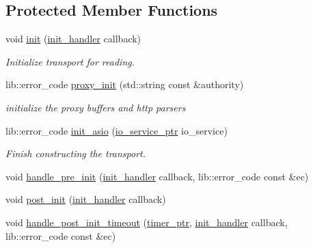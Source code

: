 \subsection*{Protected Member Functions}
\begin{DoxyCompactItemize}
\item 
void \hyperlink{classwebsocketpp_1_1transport_1_1asio_1_1connection_ae09d85b808498f06bcc8d938c9107e8e}{init} (\hyperlink{namespacewebsocketpp_1_1transport_aeae75e675c1a334b3b33ab7120b480a5}{init\+\_\+handler} callback)
\begin{DoxyCompactList}\small\item\em Initialize transport for reading. \end{DoxyCompactList}\item 
lib\+::error\+\_\+code \hyperlink{classwebsocketpp_1_1transport_1_1asio_1_1connection_a2397c24d0ab9b344d70328788de721d4}{proxy\+\_\+init} (std\+::string const \&authority)
\begin{DoxyCompactList}\small\item\em initialize the proxy buffers and http parsers \end{DoxyCompactList}\item 
lib\+::error\+\_\+code \hyperlink{classwebsocketpp_1_1transport_1_1asio_1_1connection_a6432e2cbcb4e7781a6910dd7c9aa05e6}{init\+\_\+asio} (\hyperlink{classwebsocketpp_1_1transport_1_1asio_1_1connection_a8a0bff59326cab2996e414d32f627232}{io\+\_\+service\+\_\+ptr} io\+\_\+service)
\begin{DoxyCompactList}\small\item\em Finish constructing the transport. \end{DoxyCompactList}\item 
void \hyperlink{classwebsocketpp_1_1transport_1_1asio_1_1connection_a27730f6446dd626f40b17ad1b26e5b77}{handle\+\_\+pre\+\_\+init} (\hyperlink{namespacewebsocketpp_1_1transport_aeae75e675c1a334b3b33ab7120b480a5}{init\+\_\+handler} callback, lib\+::error\+\_\+code const \&ec)
\item 
void \hyperlink{classwebsocketpp_1_1transport_1_1asio_1_1connection_ad640e3f3123494ba1e58ad9842c46169}{post\+\_\+init} (\hyperlink{namespacewebsocketpp_1_1transport_aeae75e675c1a334b3b33ab7120b480a5}{init\+\_\+handler} callback)
\item 
void \hyperlink{classwebsocketpp_1_1transport_1_1asio_1_1connection_a8c21e2814d440c6fe49a4514f6cf5ff1}{handle\+\_\+post\+\_\+init\+\_\+timeout} (\hyperlink{classwebsocketpp_1_1transport_1_1asio_1_1connection_a96d8a6cd5cf1120208b206da109a194e}{timer\+\_\+ptr}, \hyperlink{namespacewebsocketpp_1_1transport_aeae75e675c1a334b3b33ab7120b480a5}{init\+\_\+handler} callback, lib\+::error\+\_\+code const \&ec)

\end{DoxyCompactItemize}

